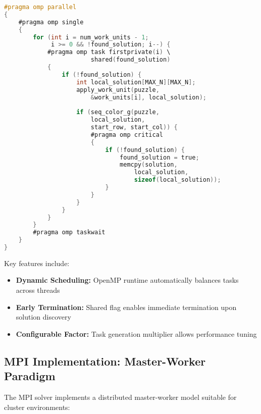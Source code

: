 \documentclass[10pt, conference]{IEEEtran}
\begin{document}
\begin{lstlisting}[language=C, caption=OpenMP task generation]
#pragma omp parallel
{
    #pragma omp single
    {
        for (int i = num_work_units - 1; 
             i >= 0 && !found_solution; i--) {
            #pragma omp task firstprivate(i) \
                        shared(found_solution)
            {
                if (!found_solution) {
                    int local_solution[MAX_N][MAX_N];
                    apply_work_unit(puzzle, 
                        &work_units[i], local_solution);
                    
                    if (seq_color_g(puzzle, 
                        local_solution, 
                        start_row, start_col)) {
                        #pragma omp critical
                        {
                            if (!found_solution) {
                                found_solution = true;
                                memcpy(solution, 
                                    local_solution, 
                                    sizeof(local_solution));
                            }
                        }
                    }
                }
            }
        }
        #pragma omp taskwait
    }
}
\end{lstlisting}

Key features include:
\begin{itemize}
    \item \textbf{Dynamic Scheduling:} OpenMP runtime automatically balances tasks across threads
    \item \textbf{Early Termination:} Shared flag enables immediate termination upon solution discovery
    \item \textbf{Configurable Factor:} Task generation multiplier allows performance tuning
\end{itemize}

\subsection{MPI Implementation: Master-Worker Paradigm}
The MPI solver implements a distributed master-worker model suitable for cluster environments:
\end{document}
